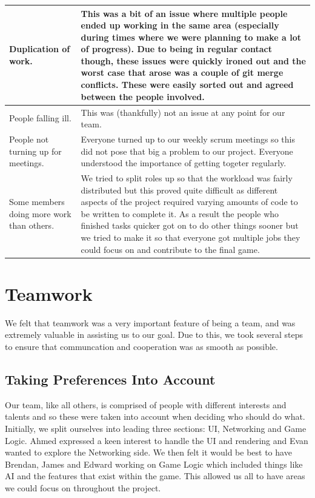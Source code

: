 \documentclass[12pt]{article}
\begin{document}
\begin{tabularx}{\textwidth}{|p{4cm}|X|}
Duplication of work. & This was a bit of an issue where multiple people ended up working in the same area (especially during times where we were planning to make a lot of progress). Due to being in regular contact though, these issues were quickly ironed out and the worst case that arose was a couple of git merge conflicts. These were easily sorted out and agreed between the people involved.  \\ \hline
People falling ill. & This was (thankfully) not an issue at any point for our team. \\ \hline
People not turning up for meetings. & Everyone turned up to our weekly scrum meetings so this did not pose that big a problem to our project. Everyone understood the importance of getting togeter regularly.\\ \hline
Some members doing more work than others. & We tried to split roles up so that the workload was fairly distributed but this proved quite difficult as different aspects of the project required varying amounts of code to be written to complete it. As a result the people who finished tasks quicker got on to do other things sooner but we tried to make it so that everyone got multiple jobs they could focus on and contribute to the final game.\\ \hline
\end{tabularx}
\newpage
\section{Teamwork}
We felt that teamwork was a very important feature of being a team, and was extremely valuable in assisting us to our goal. Due to this, we took several steps to ensure that communcation and cooperation was as smooth as possible.
\subsection{Taking Preferences Into Account}
Our team, like all others, is comprised of people with different interests and talents and so these were taken into account when deciding who should do what. Initially, we split ourselves into leading three sections: UI, Networking and Game Logic. Ahmed expressed a keen interest to handle the UI and rendering and Evan wanted to explore the Networking side. We then felt it would be best to have Brendan, James and Edward working on Game Logic which included things like AI and the features that exist within the game. This allowed us all to have areas we could focus on throughout the project.
\end{document}
